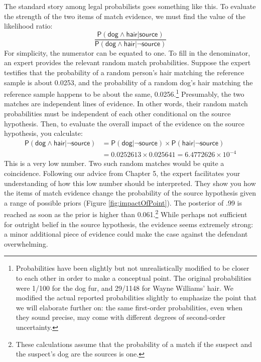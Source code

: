 \documentclass[
  10pt,
  dvipsnames,enabledeprecatedfontcommands]{scrartcl}
\newcommand{\pr}[1]{\mathsf{P}(#1)}
\newcommand{\s}[1]{\mbox{$\mathsf{#1}$}}
\begin{document}
The standard story among legal probabilists goes something like this. To
evaluate the strength of the two items of match evidence, we must find
the value of the likelihood ratio:
\[\frac{\pr{\s{dog}\wedge \s{hair} \vert \s{source}}}{\pr{\s{dog}\wedge \s{hair} \vert \neg \s{source}}}\]
For simplicity, the numerator can be equated to one. To fill in the
denominator, an expert provides the relevant random match probabilities.
Suppose the expert testifies that the probability of a random person's
hair matching the reference sample is about 0.0253, and the probability
of a random dog's hair matching the reference sample happens to be about
the same, 0.0256.\footnote{Probabilities have been slightly but not
  unrealistically modified to be closer to each other in order to make a
  conceptual point. The original probabilities were 1/100 for the dog
  fur, and 29/1148 for Wayne Williams' hair. We modified the actual
  reported probabilities slightly to emphasize the point that we will
  elaborate further on: the same first-order probabilities, even when
  they sound precise, may come with different degrees of second-order
  uncertainty.} Presumably, the two matches are independent lines of
evidence. In other words, their random match probabilities must be
independent of each other conditional on the source hypothesis. Then, to
evaluate the overall impact of the evidence on the source hypothesis,
you calculate: \begin{align*}
\pr{\s{dog}\wedge \s{hair} \vert \neg \s{source}} & = \pr{\s{dog} \vert \neg \s{source}} \times \pr{\s{hair} \vert \neg \s{source}} \\
& =  0.0252613 \times  0.025641 = \ensuremath{6.4772626\times 10^{-4}}
\end{align*} This is a very low number. Two such random matches would be
quite a coincidence. Following our advice from Chapter 5, the expert
facilitates your understanding of how this low number should be
interpreted. They show you how the items of match evidence change the
probability of the source hypothesis given a range of possible priors
(Figure \ref{fig:impactOfPoint}). The posterior of .99 is reached as
soon as the prior is higher than 0.061.\footnote{These calculations
  assume that the probability of a match if the suspect and the
  suspect's dog are the sources is one.} While perhaps not sufficient
for outright belief in the source hypothesis, the evidence seems
extremely strong: a minor additional piece of evidence could make the
case against the defendant overwhelming.
\end{document}
